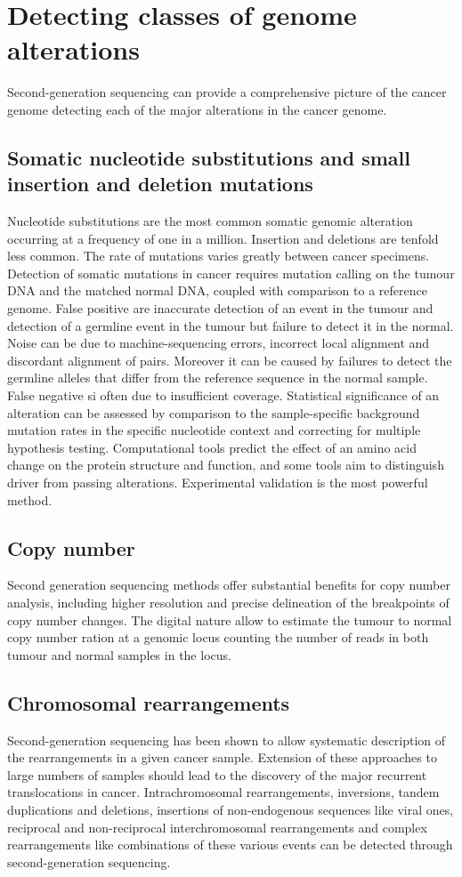 \section{Detecting classes of genome alterations}
Second-generation sequencing can provide a comprehensive picture of the cancer genome detecting each of the major alterations in the cancer genome.

	\subsection{Somatic nucleotide substitutions and small insertion and deletion mutations}
	Nucleotide substitutions are the most common somatic genomic alteration occurring at a frequency of one in a million.
	Insertion and deletions are tenfold less common.
	The rate of mutations varies greatly between cancer specimens.
	Detection of somatic mutations in cancer requires mutation calling on the tumour DNA and the matched normal DNA, coupled with comparison to a reference genome.
	False positive are inaccurate detection of an event in the tumour and detection of a germline event in the tumour but failure to detect it in the normal.
	Noise can be due to machine-sequencing errors, incorrect local alignment and discordant alignment of pairs.
	Moreover it can be caused by failures to detect the germline alleles that differ from the reference sequence in the normal sample.
	False negative si often due to insufficient coverage.
	Statistical significance of an alteration can be assessed by comparison to the sample-specific background mutation rates in the specific nucleotide context and correcting for multiple hypothesis testing.
	Computational tools predict the effect of an amino acid change on the protein structure and function, and some tools aim to distinguish driver from passing alterations.
	Experimental validation is the most powerful method.

	\subsection{Copy number}
	Second generation sequencing methods offer substantial benefits for copy number analysis, including higher resolution and precise delineation of the breakpoints of copy number changes.
	The digital nature allow to estimate the tumour to normal copy number ration at a genomic locus counting the number of reads in both tumour and normal samples in the locus.

	\subsection{Chromosomal rearrangements}
	Second-generation sequencing has been shown to allow systematic description of the rearrangements in a given cancer sample.
	Extension of these approaches to large numbers of samples should lead to the discovery of the major recurrent translocations in cancer.
	Intrachromosomal rearrangements, inversions, tandem duplications and deletions, insertions of non-endogenous sequences like viral ones, reciprocal and non-reciprocal interchromosomal rearrangements and complex rearrangements like combinations of these various events can be detected through second-generation sequencing.

